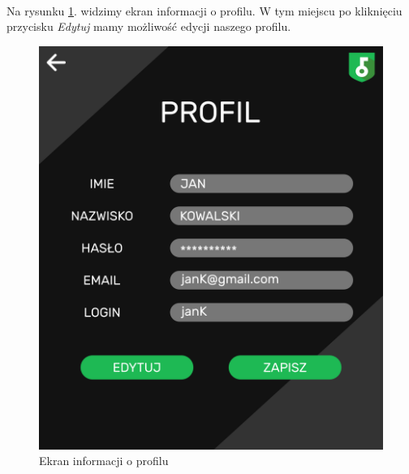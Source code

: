 \documentclass[a4paper]{article}
\begin{document}
\paragraph{}Na rysunku \ref{fig:profil}. widzimy ekran informacji o profilu. W tym miejscu po kliknięciu przycisku \textit{Edytuj} mamy możliwość edycji naszego profilu.
\begin{figure}[H]
    \centering
    \includegraphics[height=1\textwidth]{img/ekran_profilu.png}
    \caption{Ekran informacji o profilu}
    \label{fig:profil}
\end{figure}

\newpage
\end{document}
